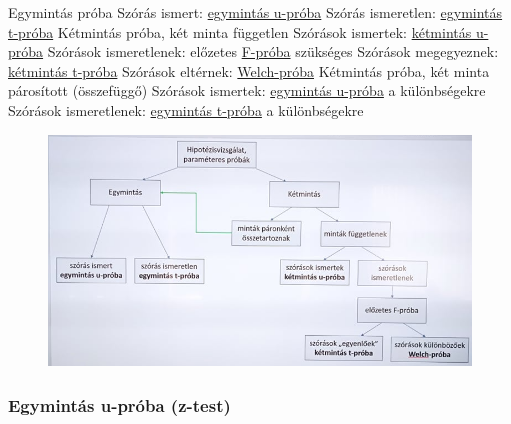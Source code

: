 \documentclass[12pt,a4paper]{article}
\begin{document}
\begin{outline}
	\1 Egymintás próba
		\2 Szórás ismert: \hyperref[sec:próba-1minta-u]{egymintás u-próba}
		\2 Szórás ismeretlen: \hyperref[sec:próba-1minta-t]{egymintás t-próba}
	\1 Kétmintás próba, két minta független
		\2 Szórások ismertek: \hyperref[sec:próba-2minta-u]{kétmintás u-próba}
		\2 Szórások ismeretlenek: előzetes \hyperref[sec:próba-F]{F-próba} szükséges
			\3 Szórások megegyeznek: \hyperref[sec:próba-2minta-t]{kétmintás t-próba}
			\3 Szórások eltérnek: \hyperref[sec:próba-welch]{Welch-próba}
	\1 Kétmintás próba, két minta párosított (összefüggő)
		\2 Szórások ismertek: \hyperref[sec:próba-1minta-u]{egymintás u-próba} a különbségekre
		\2 Szórások ismeretlenek: \hyperref[sec:próba-1minta-t]{egymintás t-próba} a különbségekre
\end{outline}

\begin{figure}[h!]
	\centering
	\includegraphics[width=1\linewidth]{paraméteres-próba-választás}
\end{figure}

\pagebreak

\subsubsection{Egymintás u-próba (z-test)}
\label{sec:próba-1minta-u}
\end{document}
